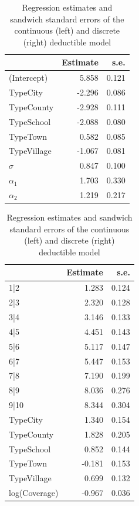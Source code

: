 \documentclass[11pt]{article}
\newcommand{\rev}[1]{{\color{blue}#1}}
\begin{document}
\begin{table}[!ht]
    \centering
    \begin{minipage}{0.45\textwidth}
        \centering\color{blue}
        \label{tab:continuousD}
        \begin{tabular}{lrr}
            \toprule
            & Estimate & s.e.\\
            \midrule
            (Intercept) & 5.858 & 0.121\\
            TypeCity & -2.296 & 0.086\\
            TypeCounty & -2.928 & 0.111\\
            TypeSchool & -2.088 & 0.080\\
            TypeTown & 0.582 & 0.085\\
            TypeVillage & -1.067 & 0.081\\
            $\sigma$ & 0.847 & 0.100\\
            $\alpha_1$ & 1.703 & 0.330\\
            $\alpha_2$ & 1.219 & 0.217\\
            \bottomrule
        \end{tabular}
    \end{minipage}
    \hfill 
    \begin{minipage}{0.45\textwidth}
        \centering\color{blue}
        \label{tab:discreteD}
        \begin{tabular}{lrr}
            \toprule
            & Estimate & s.e.\\
            \midrule
            1|2 & 1.283 & 0.124\\
            2|3 & 2.320 & 0.128\\
            3|4 & 3.146 & 0.133\\
            4|5 & 4.451 & 0.143\\
            5|6 & 5.117 & 0.147\\
            6|7 & 5.447 & 0.153\\
            7|8 & 7.190 & 0.199\\
            8|9 & 8.036 & 0.276\\
            9|10 & 8.344 & 0.304\\
            \midrule
            TypeCity & 1.340 & 0.154\\
            TypeCounty & 1.828 & 0.205\\
            TypeSchool & 0.852 & 0.144\\
            TypeTown & -0.181 & 0.153\\
            TypeVillage & 0.699 & 0.132\\
            log(Coverage) & -0.967 & 0.036\\
            \bottomrule
        \end{tabular}
    \end{minipage}
    \caption{Regression estimates \rev{and sandwich standard errors} of the continuous (left) and discrete (right) deductible model}
    \label{tab:contD}
\end{table}
\end{document}
